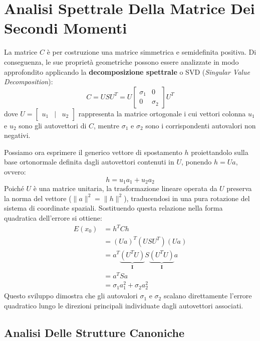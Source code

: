 ﻿\documentclass[11pt, a4paper]{article}
\begin{document}
\newpage

\section{Analisi Spettrale Della Matrice Dei Secondi Momenti}

La matrice $C$ è per costruzione una matrice simmetrica e semidefinita positiva. Di conseguenza, le sue proprietà geometriche possono essere analizzate in modo approfondito applicando la \textbf{decomposizione spettrale} o SVD (\emph{Singular Value Decomposition}):
\begin{equation}
    C = U S U^T = U \begin{bmatrix} \sigma_1 & 0 \\ 0 & \sigma_2 \end{bmatrix} U^T
\end{equation}
dove $U = \begin{bmatrix} u_1 & | & u_2 \end{bmatrix}$ rappresenta la matrice ortogonale i cui vettori colonna $u_1$ e $u_2$ sono gli autovettori di $C$, mentre $\sigma_1$ e $\sigma_2$ sono i corrispondenti autovalori non negativi.

Possiamo ora esprimere il generico vettore di spostamento $h$ proiettandolo sulla base ortonormale definita dagli autovettori contenuti in $U$, ponendo $h = U a$, ovvero:
\begin{equation}
    h = u_1 a_1 + u_2 a_2
\end{equation}
Poiché $U$ è una matrice unitaria, la trasformazione lineare operata da $U$ preserva la norma del vettore ($\|a\|^2 = \|h\|^2$), traducendosi in una pura rotazione del sistema di coordinate spaziali. Sostituendo questa relazione nella forma quadratica dell'errore si ottiene:
\begin{align*}
    E(x_0) &= h^T C h \\
    &= (U a)^T (U S U^T) (U a) \\
    &= a^T \underbrace{(U^T U)}_{\bm{I}} S \underbrace{(U^T U)}_{\bm{I}} a \\
    &= a^T S a \\
    &= \boxed{\sigma_1 a_1^2 + \sigma_2 a_2^2}
\end{align*}
Questo sviluppo dimostra che gli autovalori $\sigma_1$ e $\sigma_2$ scalano direttamente l'errore quadratico lungo le direzioni principali individuate dagli autovettori associati.

\subsection{Analisi Delle Strutture Canoniche}
\end{document}
